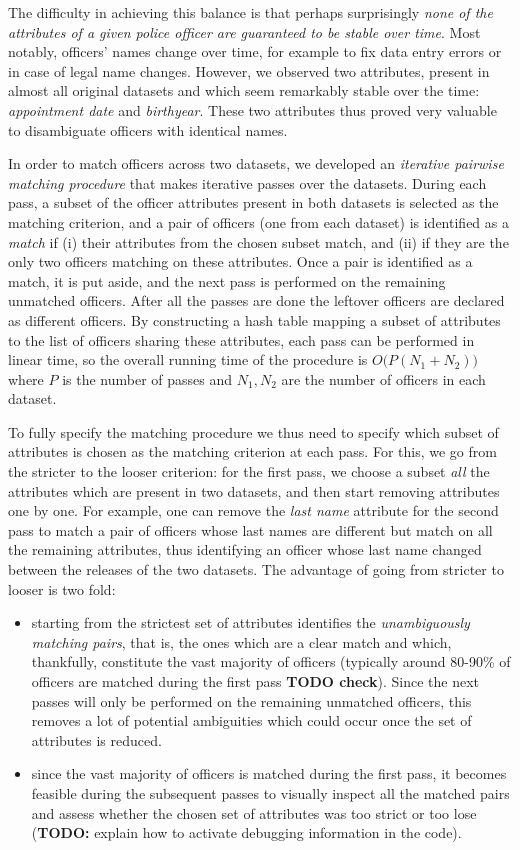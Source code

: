 The difficulty in achieving this balance is that perhaps surprisingly
\emph{none of the attributes of a given police officer are guaranteed to be
stable over time}. Most notably, officers' names change over time, for example
to fix data entry errors or in case of legal name changes. However, we observed
two attributes, present in almost all original datasets and which seem
remarkably stable over the time: \emph{appointment date} and \emph{birthyear}.
These two attributes thus proved very valuable to disambiguate officers with
identical names.

In order to match officers across two datasets, we developed an \emph{iterative
pairwise matching procedure} that makes iterative passes over the datasets.
During each pass, a subset of the officer attributes present in both datasets
is selected as the matching criterion, and a pair of officers (one from each
dataset) is identified as a \emph{match} if (i) their attributes from the
chosen subset match, and (ii) if they are the only two officers matching on
these attributes. Once a pair is identified as a match, it is put aside, and
the next pass is performed on the remaining unmatched officers. After all the
passes are done the leftover officers are declared as different officers. By
constructing a hash table mapping a subset of attributes to the list of
officers sharing these attributes, each pass can be performed in linear time,
so the overall running time of the procedure is $O\big(P(N_1+N_2)\big)$ where
$P$ is the number of passes and $N_1, N_2$ are the number of officers in each
dataset.

To fully specify the matching procedure we thus need to specify which subset of
attributes is chosen as the matching criterion at each pass. For this, we go
from the stricter to the looser criterion: for the first pass, we choose
a subset \emph{all} the attributes which are present in two datasets, and then
start removing attributes one by one. For example, one can remove the
\emph{last name} attribute for the second pass to match a pair of officers
whose last names are different but match on all the remaining attributes, thus
identifying an officer whose last name changed between the releases of the two
datasets. The advantage of going from stricter to looser is two fold:
\begin{itemize}
	\item starting from the strictest set of attributes identifies the
		\emph{unambiguously matching pairs}, that is, the ones which are
		a clear match and which, thankfully, constitute the vast majority of
		officers (typically around 80-90\% of officers are matched during the
		first pass \textbf{TODO check}). Since the next passes will only be
		performed on the remaining unmatched officers, this removes a lot of
		potential ambiguities which could occur once the set of attributes is
		reduced.
	\item since the vast majority of officers is matched during the first pass,
		it becomes feasible during the subsequent passes to visually inspect all
		the matched pairs and assess whether the chosen set of attributes was
		too strict or too lose (\textbf{TODO:} explain how to activate
		debugging information in the code).
\end{itemize}

